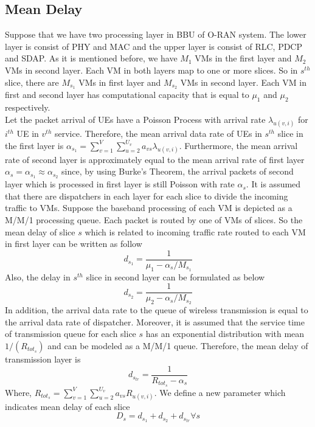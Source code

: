 \documentclass[conference]{IEEEtran}
\begin{document}
\subsection{Mean Delay}
Suppose that we have two processing layer in BBU of O-RAN system. The lower layer is consist of PHY and MAC and the upper layer is consist of RLC, PDCP and SDAP.\newline   
As it is mentioned before, we have $M_1$ VMs in the first layer and $M_2$ VMs in second layer. Each VM in both layers map to one or more slices. So in $s^{th}$ slice, there are $M_{s_1}$ VMs in first layer and $M_{s_2}$ VMs in second layer. Each VM in first and second layer has computational capacity that is  equal to $\mu_1$ and $\mu_2$ respectively. \\
Let the packet arrival of UEs have a Poisson Process with arrival rate $\lambda_{u(v,i)}$ for $i^{th}$ UE in $v^{th}$ service. 
Therefore, the mean arrival data rate of UEs in $s^{th}$ slice in the first layer is 
$\alpha_{s_1} = \sum_{v=1}^{V}\sum_{u=2}^{U_v}a_{vs}\lambda_{u(v,i)}$.  
Furthermore, the mean arrival rate of second layer is approximately equal to the mean arrival rate of first layer $\alpha_{s} =\alpha_{s_1} \approx \alpha_{s_2}$ since, by using Burke’s Theorem, the arrival packets of second layer which is processed in first layer is still Poisson with rate $\alpha_{s}$. 
It is assumed that there are dispatchers in each layer for each slice to divide the incoming traffic to VMs.
Suppose the baseband processing of each VM is depicted as a M/M/1 processing queue.
Each packet is routed by one of VMs of slices. So the mean delay of slice $s$ which is related to incoming traffic rate routed to
each VM in first layer can be written as follow
\begin{equation}
d_{s_1} = \frac{1}{\mu_1 - \alpha_{s}/{M_{s_1}}}
\end{equation}
Also, the delay in $s^{th}$ slice in second layer can be formulated as below
\begin{equation}
d_{s_2} = \frac{1}{\mu_2 - \alpha_{s}/{M_{s_2}}}
\end{equation}
In addition, the arrival data rate to the queue of wireless transmission
 is equal to the arrival data rate of dispatcher.
Moreover, it is assumed that the service time of transmission queue for each slice $s$ has 
 an exponential distribution with mean $1/(R_{{tot}_s})$ and can be modeled as a M/M/1 queue. Therefore, 
the mean delay of transmission layer is 
\begin{equation}
d_{s_{tr}} = \frac{1}{R_{{tot}_s} - \alpha_{s}}
\end{equation}
Where, $R_{{tot}_s} =  \sum_{v=1}^{V}\sum_{u=2}^{U_v}a_{vs}R_{u(v,i)}$.
We define a new parameter which indicates mean delay of each slice
\begin{equation}
D_{s} = d_{s_1} + d_{s_2} + d_{s_{tr}} \forall s
\end{equation} 
\end{document}

